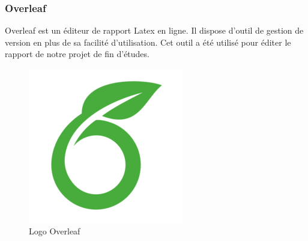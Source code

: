 \subsubsection{Overleaf}
\noindent\begin{minipage}{0.69\textwidth}
Overleaf est un éditeur de rapport Latex en ligne. Il dispose d'outil de gestion de version en plus de sa facilité d'utilisation. Cet outil a été utilisé pour éditer le rapport de notre projet de fin d'études.
\end{minipage}
\begin{minipage}{0.3\textwidth}
\begin{figure}[H]
  \centering
  \includegraphics[scale=1]{figures/logo/overleaf.png}
  \caption{Logo Overleaf}
  \label{code28}
\end{figure}
\end{minipage}
